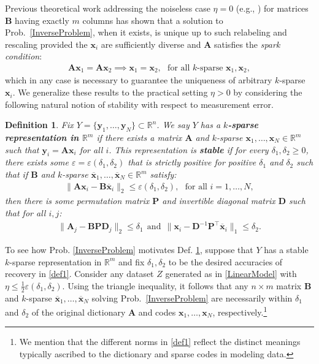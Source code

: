 \documentclass[journal, twocolumn]{IEEEtran}
\newtheorem{definition}{Definition}
\begin{document}
Previous theoretical work addressing the noiseless case $\eta =0$ (e.g., \cite{li2004analysis, Georgiev05, Aharon06, Hillar15}) for matrices $\mathbf{B}$ having exactly $m$ columns has shown that a solution to Prob.~\ref{InverseProblem}, when it exists, is unique up to such relabeling and rescaling provided the $\mathbf{x}_i$ are sufficiently diverse and $\mathbf{A}$ satisfies the \textit{spark condition}:
\begin{align}\label{SparkCondition}
\mathbf{A}\mathbf{x}_1 = \mathbf{A}\mathbf{x}_2 \implies \mathbf{x}_1 = \mathbf{x}_2, \ \ \ \text{for all $k$-sparse } \mathbf{x}_1, \mathbf{x}_2,
\end{align}
%
which in any case is necessary to guarantee the uniqueness of arbitrary $k$-sparse $\mathbf{x}_i$. We generalize these results to the practical setting  $\eta > 0$ by considering the following natural notion of stability with respect to measurement error.

\begin{definition}\label{maindef}
Fix $Y = \{ \mathbf{y}_1, \ldots, \mathbf{y}_N\} \subset \mathbb{R}^n$. We say $Y$ has a \textbf{$k$-sparse representation in $\mathbb{R}^m$} if there exists a matrix $\mathbf{A}$ and $k$-sparse $\mathbf{x}_1, \ldots, \mathbf{x}_N \in \mathbb{R}^m$ such that $\mathbf{y}_i = \mathbf{A}\mathbf{x}_i$ for all $i$. 
This representation is \textbf{stable} if for every $\delta_1, \delta_2 \geq 0$, there exists some $\varepsilon = \varepsilon(\delta_1, \delta_2)$ that is strictly positive for positive $\delta_1$ and $\delta_2$ such that if $\mathbf{B}$ and $k$-sparse $\mathbf{\overline x}_1, \ldots, \mathbf{\overline x}_N \in \mathbb{R}^m$ satisfy:
\begin{align*}
	\|\mathbf{A}\mathbf{x}_i - \mathbf{B}\mathbf{\overline x}_i\|_2 \leq \varepsilon(\delta_1, \delta_2),\ \ \   \text{for all $i=1,\ldots,N$},
\end{align*}
then there is some permutation matrix $\mathbf{P}$ and invertible diagonal matrix $\mathbf{D}$ such that for all $i, j$:
\begin{align}\label{def1}
\|\mathbf{A}_j - \mathbf{BPD}_j\|_2 \leq \delta_1 \ \ \text{and} \ \ \|\mathbf{x}_i - \mathbf{D}^{-1}\mathbf{P}^{\top}\mathbf{\overline x}_i\|_1 \leq \delta_2.
\end{align}
\end{definition}

To see how Prob. \ref{InverseProblem} motivates Def. \ref{maindef}, suppose that $Y$ has a stable $k$-sparse representation in $\mathbb{R}^m$ and fix $\delta_1, \delta_2$ to be the desired accuracies of recovery in \eqref{def1}. Consider any dataset $Z$ generated as in \eqref{LinearModel} with $\eta \leq \frac{1}{2} \varepsilon(\delta_1, \delta_2)$. Using the triangle inequality, it follows that any $n \times m$ matrix $\mathbf{B}$ and $k$-sparse $\mathbf{\overline x}_1, \ldots, \mathbf{\overline x}_N$ solving Prob.~\ref{InverseProblem} are necessarily within $\delta_1$ and $\delta_2$ of the original dictionary $\mathbf{A}$ and codes $\mathbf{x}_1, \ldots, \mathbf{x}_N$, respectively.\footnote{We mention that the different norms in \eqref{def1} reflect the distinct meanings typically ascribed to the dictionary and sparse codes in modeling data.}
\end{document}

